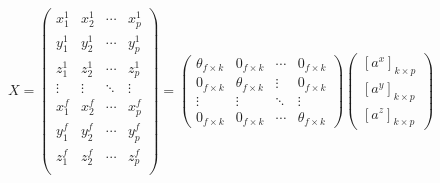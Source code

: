\begin{equation}
	X=
	\begin{pmatrix}
		x_{1}^{1} & x_{2}^{1} & \cdots & x_{p}^{1}\\
		y_{1}^{1} & y_{2}^{1} & \cdots & y_{p}^{1}\\
		z_{1}^{1} & z_{2}^{1} & \cdots & z_{p}^{1}\\
		\vdots & \vdots & \ddots & \vdots \\
		x_{1}^{f} & x_{2}^{f} & \cdots & x_{p}^{f}\\
		y_{1}^{f} & y_{2}^{f} & \cdots & y_{p}^{f}\\
		z_{1}^{f} & z_{2}^{f} & \cdots & z_{p}^{f}\\
	\end{pmatrix}=
	\begin{pmatrix}
		\theta_{f\times k} & 0_{f\times k} & \cdots & 0_{f\times k} \\		
		0_{f\times k} &  \theta_{f\times k} & \vdots & 0_{f\times k}\\
		\vdots &  \vdots &\ddots & \vdots \\
		0_{f\times k} & 0_{f\times k} &  \cdots & \theta_{f\times k}		
	\end{pmatrix}
	\begin{pmatrix}
		[a^{x}]_{k\times p} \\		
		[a^{y}]_{k\times p} \\
		[a^{z}]_{k\times p}				
	\end{pmatrix}	
\end{equation} 